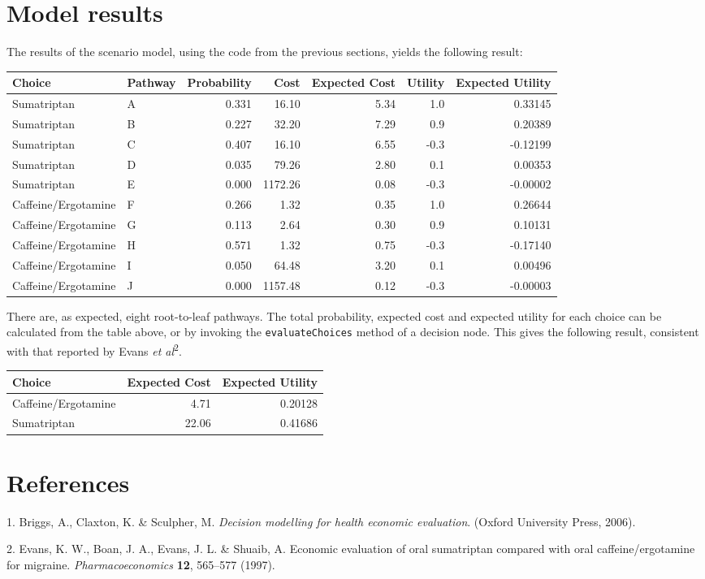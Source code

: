 \documentclass[]{article}
\begin{document}
\hypertarget{model-results}{%
\section{Model results}\label{model-results}}

The results of the scenario model, using the code from the previous
sections, yields the following result:

\begin{longtable}[]{@{}llrrrrr@{}}
\toprule
Choice & Pathway & Probability & Cost & Expected Cost & Utility &
Expected Utility\tabularnewline
\midrule
\endhead
Sumatriptan & A & 0.331 & 16.10 & 5.34 & 1.0 & 0.33145\tabularnewline
Sumatriptan & B & 0.227 & 32.20 & 7.29 & 0.9 & 0.20389\tabularnewline
Sumatriptan & C & 0.407 & 16.10 & 6.55 & -0.3 & -0.12199\tabularnewline
Sumatriptan & D & 0.035 & 79.26 & 2.80 & 0.1 & 0.00353\tabularnewline
Sumatriptan & E & 0.000 & 1172.26 & 0.08 & -0.3 &
-0.00002\tabularnewline
Caffeine/Ergotamine & F & 0.266 & 1.32 & 0.35 & 1.0 &
0.26644\tabularnewline
Caffeine/Ergotamine & G & 0.113 & 2.64 & 0.30 & 0.9 &
0.10131\tabularnewline
Caffeine/Ergotamine & H & 0.571 & 1.32 & 0.75 & -0.3 &
-0.17140\tabularnewline
Caffeine/Ergotamine & I & 0.050 & 64.48 & 3.20 & 0.1 &
0.00496\tabularnewline
Caffeine/Ergotamine & J & 0.000 & 1157.48 & 0.12 & -0.3 &
-0.00003\tabularnewline
\bottomrule
\end{longtable}

There are, as expected, eight root-to-leaf pathways. The total
probability, expected cost and expected utility for each choice can be
calculated from the table above, or by invoking the
\texttt{evaluateChoices} method of a decision node. This gives the
following result, consistent with that reported by Evans \emph{et
al}\textsuperscript{2}.

\begin{longtable}[]{@{}lrr@{}}
\toprule
Choice & Expected Cost & Expected Utility\tabularnewline
\midrule
\endhead
Caffeine/Ergotamine & 4.71 & 0.20128\tabularnewline
Sumatriptan & 22.06 & 0.41686\tabularnewline
\bottomrule
\end{longtable}

\hypertarget{references}{%
\section*{References}\label{references}}

\hypertarget{refs}{}
\leavevmode\hypertarget{ref-briggs:2002a}{}%
1. Briggs, A., Claxton, K. \& Sculpher, M. \emph{Decision modelling for
health economic evaluation}. (Oxford University Press, 2006).

\leavevmode\hypertarget{ref-evans:1997a}{}%
2. Evans, K. W., Boan, J. A., Evans, J. L. \& Shuaib, A. Economic
evaluation of oral sumatriptan compared with oral caffeine/ergotamine
for migraine. \emph{Pharmacoeconomics} \textbf{12}, 565--577 (1997).
\end{document}
